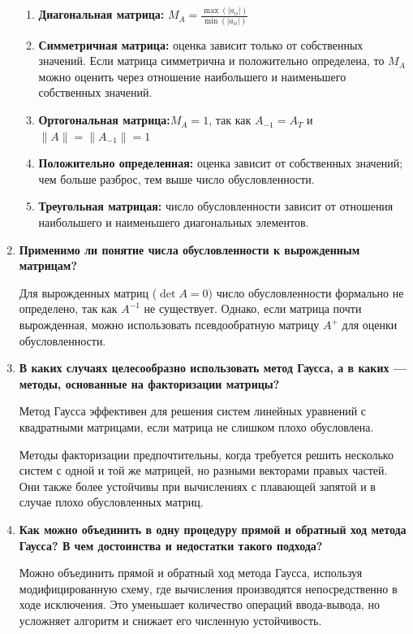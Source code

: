 \documentclass[12pt, a4paper]{article}
\begin{document}
\begin{enumerate}
		\begin{enumerate}
			\item \textbf{ Диагональная матрица:} $M_{A}=\frac{\max(|a_{ii}|)}{\min (|a_{ii}|)}$
			\item \textbf{ Симметричная матрица:} оценка зависит только от собственных значений. Если матрица симметрична и положительно определена, то $M_{A}$ можно оценить через отношение наибольшего и наименьшего собственных значений.
			\item \textbf{ Ортогональная матрица:}$M_{A}=1$, так как $A_{-1}=A_{T}$ и $\|A\|=\|A_{-1}\|=1$
			\item \textbf{ Положительно определенная:} оценка зависит от собственных значений; чем больше разброс, тем выше число обусловленности.
			\item \textbf{ Треугольная матрицая:} число обусловленности зависит от отношения наибольшего и наименьшего диагональных элементов.
		\end{enumerate}
		
		\item \textbf{Применимо ли понятие числа обусловленности к вырожденным матрицам?}
		
		Для вырожденных матриц ($\det A = 0$) число обусловленности формально не определено, так как $A^{-1}$
		не существует. Однако, если матрица почти вырожденная, можно использовать псевдообратную матрицу $A^{+}$
		для оценки обусловленности.
		\item \textbf{В каких случаях целесообразно использовать метод Гаусса,
			а в каких — методы, основанные на факторизации матрицы?}
		
		Метод Гаусса эффективен для решения систем линейных уравнений с квадратными матрицами, если матрица не слишком плохо обусловлена.
		
		Методы факторизации предпочтительны, когда требуется решить несколько систем с одной и той же матрицей, но разными векторами правых частей. Они также более устойчивы при вычислениях с плавающей запятой и в случае плохо обусловленных матриц.
		
		\item \textbf{Как можно объединить в одну процедуру прямой и обратный ход метода Гаусса? В чем достоинства и недостатки такого подхода?}
		
		Можно объединить прямой и обратный ход метода Гаусса, используя модифицированную схему, где вычисления производятся непосредственно в ходе исключения. Это уменьшает количество операций ввода-вывода, но усложняет алгоритм и снижает его численную устойчивость.
		

\end{enumerate}
\end{document}
